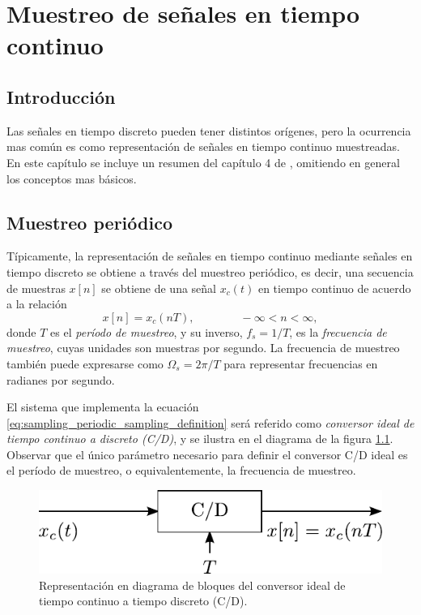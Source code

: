 \documentclass[a4paper]{report}
\begin{document}
\chapter{Muestreo de señales en tiempo continuo}\label{ch:sampling}

\section{Introducción}

Las señales en tiempo discreto pueden tener distintos orígenes, pero la ocurrencia mas común es como representación de señales en tiempo continuo muestreadas. En este capítulo se incluye un resumen del capítulo 4 de \cite{oppenheim2009discrete}, omitiendo en general los conceptos mas básicos.

\section{Muestreo periódico}

Típicamente, la representación de señales en tiempo continuo mediante señales en tiempo discreto se obtiene a través del muestreo periódico, es decir, una secuencia de muestras \(x[n]\) se obtiene de una señal \(x_c(t)\) en tiempo continuo de acuerdo a la relación
\begin{equation}\label{eq:sampling_periodic_sampling_definition}
 x[n]=x_c(nT),
 \qquad\qquad 
 -\infty<n<\infty, 
\end{equation}
donde \(T\) es el \emph{período de muestreo}, y su inverso, \(f_s=1/T\), es la \emph{frecuencia de muestreo}, cuyas unidades son muestras por segundo. La frecuencia de muestreo también puede expresarse como \(\Omega_s=2\pi/T\) para representar frecuencias en radianes por segundo.

El sistema que implementa la ecuación \ref{eq:sampling_periodic_sampling_definition} será referido como \emph{conversor ideal de tiempo continuo a discreto (C/D)}, y se ilustra en el diagrama de la figura \ref{fig:sampling_continous_discrete_converter}. Observar que el único parámetro necesario para definir el conversor C/D ideal es el período de muestreo, o equivalentemente, la frecuencia de muestreo. 
\begin{figure}[!htb]
  \begin{minipage}[c]{0.39\textwidth}
    \includegraphics[width=\textwidth]{figuras/sampling_continous_discrete_converter.pdf}
  \end{minipage}\hfill
  \begin{minipage}[c]{0.51\textwidth}
    \caption{
     Representación en diagrama de bloques del conversor ideal de tiempo continuo a tiempo discreto (C/D).
    }\label{fig:sampling_continous_discrete_converter}
  \end{minipage}
\end{figure}
\end{document}
